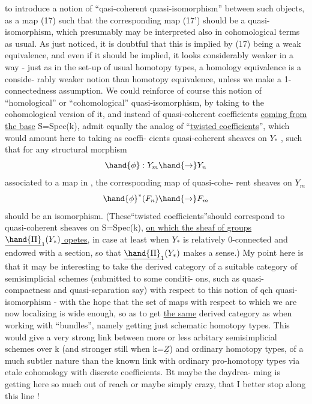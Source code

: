 
to introduce a notion of ``qasi-coherent  quasi-isomorphism'' between
such objects, as a map (17) such that the corresponding map (17')
should be a quasi-isomorphism, which presumably may be interpreted also
in cohomological terms\hand{,} as usual. As just noticed, it is doubtful that
this is implied by (17) being a weak equivalence, and even if it should
be implied, it looks considerably weaker in a way - just as in the
set-up of usual homotopy types,  a homology equivalence is a conside-%
rably weaker notion than homotopy equivalence, unless  we make 
a 1-connectedness assumption. We could reinforce of course this notion
of  ``homological'' or ``cohomological'' quasi-isomorphism, by taking to the
cohomological version of it, and instead of quasi-coherent 
coefficients \uline{coming from the base} S=Spec(k), admit equally the analog
of ``\uline{twisted coefficients}'', which would amount here to taking as coeffi-%
cients quasi-coherent sheaves  on $Y_*$ , such that for any structural
morphism
\[ \hand{\phi} : Y_m \hand{\to} Y_n \]
associated to a map in \hand{$\Delta$} , the corresponding map of  quasi-cohe-%
rent sheaves on $Y_m$
\[ \hand{\phi}^*(F_n) \hand{\to} F_m \]
should be an isomorphism. (These``twisted coefficients''should correspond
to quasi-coherent sheaves on S=Spec(k), \uline{on which the sheaf of groups
$\underline{\hand{\Pi}}_1(Y_*)$ opetes}, in case at least when $Y_*$ is relatively 0-connected
and endowed with a section, so that $\underline{\hand{\Pi}}_1(Y_*)$ makes a sense.) My point
here is that it may be interesting to take the derived category of a
suitable category of semisimplicial schemes (submitted to some  conditi-%
ons, such as quasi-compactness and quasi-separation say) with respect
 to this notion of qch quasi-isomorphism - with the hope that the set of
maps with respect to which we are now localizing is wide enough, so as
to get \uline{the same} derived category as when working  with ``bundles'', namely
getting just schematic homotopy types. This would give a very strong
link between more or less arbitary semisimplicial schemes over k (and
stronger still when k=$\underline{Z}$)\hand{,} and ordinary homotopy types, of a much subtler
nature than the known link with ordinary pro-homotopy types via etale
cohomology with discrete coefficients. Bt maybe  the daydrea-%
ming is getting here so much out of reach or maybe simply crazy, that
I better stop along this line !


